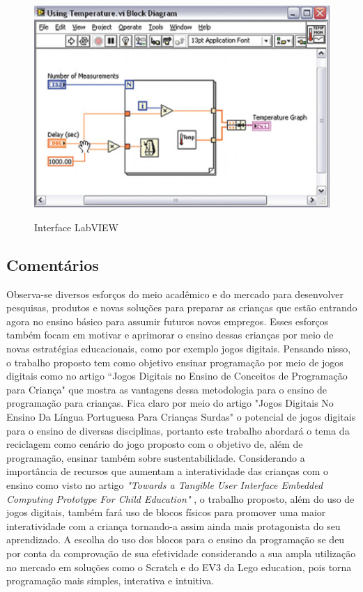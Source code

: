 \begin{figure}[H]
    \caption{Interface LabVIEW}
    \centering
        \includegraphics[width=\linewidth]{Imagens/cap2/labview.png}
    \label{figura:labview}
\end{figure}

\subsection{Comentários}
Observa-se diversos esforços do meio acadêmico e do mercado para desenvolver pesquisas, produtos e novas soluções para preparar as crianças que estão entrando agora no ensino básico para assumir futuros novos empregos. Esses esforços também focam em motivar e aprimorar o ensino dessas crianças por meio de novas estratégias educacionais, como  por exemplo jogos digitais. Pensando nisso, o trabalho proposto tem como objetivo ensinar programação por meio de jogos digitais como no artigo “Jogos Digitais no Ensino de Conceitos de Programação para Criança" \cite{tadesco_2016} que mostra as vantagens dessa metodologia para o ensino de programação para crianças. Fica claro por meio do artigo "Jogos Digitais No Ensino Da Língua Portuguesa Para Crianças Surdas" \cite{liz_2017} o potencial de jogos digitais para o ensino de diversas disciplinas, portanto este trabalho abordará o tema da reciclagem como cenário do jogo proposto com o objetivo de, além de programação, ensinar também sobre sustentabilidade. Considerando a importância de recursos que aumentam a interatividade das crianças com o ensino como visto no artigo \textit{"Towards a Tangible User Interface Embedded Computing Prototype For Child Education"} \cite{carneiro_2018}, o trabalho proposto, além do uso de jogos digitais, também fará uso de blocos físicos para promover uma maior interatividade com a criança tornando-a assim ainda mais protagonista do seu aprendizado. A escolha do uso dos blocos para o ensino da programação se deu por conta da comprovação de sua efetividade considerando a sua ampla utilização no mercado em soluções como o Scratch e do EV3 da Lego education, pois torna programação mais simples, interativa e intuitiva. 




